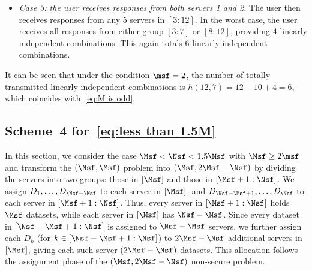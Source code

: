 \documentclass[conference,letterpaper]{IEEEtran}
\begin{document}
\begin{example}
\begin{itemize}
\item {\it Case 3: the user receives responses from both servers 1 and 2.} The user then receives responses from any 5 servers in $[3:12]$. In the worst case, the user receives all responses from either group $[3:7]$ or $[8:12]$, providing 4 linearly independent combinations. This again totals 6 linearly independent combinations.
\end{itemize}
It can be seen that under the condition $\msf = 2$, the number of totally transmitted linearly independent combinations is $h(12,7) = 12 - 10 + 4 = 6$, which coincides with~\eqref{eq:M is odd}.


\fi

\end{example}

\subsection{\texorpdfstring{Scheme~4 for~\eqref{eq:less than 1.5M}}{Scheme 4 for Eq. (Z)}}
\label{sub:less than 1.5M}
In this section, we consider the case \( \Msf < \Nsf < 1.5 \Msf \) with \( \Msf \ge 2 \msf \) and transform the \((\Nsf,\Msf)\) problem into \((\Msf, 2\Msf - \Nsf)\) by dividing the servers into two groups: those in \([\Msf]\) and those in \([\Msf+1 : \Nsf]\).
We assign \(D_1, \ldots, D_{\Nsf - \Msf}\) to each server in \([\Msf]\), and \(D_{\Nsf - \Msf + 1}, \ldots, D_{\Nsf}\) to each server in \([\Msf+1 : \Nsf]\). Thus, every server in \([\Msf+1 : \Nsf]\) holds \(\Msf\) datasets, while each server in \([\Msf]\) has \(\Nsf - \Msf\). Since every dataset in \([\Nsf - \Msf + 1 : \Nsf]\) is assigned to \(\Nsf - \Msf\) servers, we further assign each \(D_k\) (for \(k \in [\Nsf - \Msf + 1 : \Nsf]\)) to \(2\Msf - \Nsf\) additional servers in \([\Msf]\), giving each such server \((2\Msf - \Nsf)\) datasets. This allocation follows the assignment phase of the \((\Msf, 2\Msf - \Nsf)\) non-secure problem.


\iffalse
\section{Conclusion}
We focus on the secure distributed linearly separable computation problem, which prevents the user from accessing any information about the dataset besides the task function. We first research the minimum source key size under general computation cost while achieving optimal communication cost. For this purpose, we propose a new computing scheme with a novel assignment strategy. The computing scheme can cover the optimality results of the computing scheme with fractional repetition assignment. The new computing scheme is also applicable to the case of minimal computation cost in \cite{wan2022secure}.
\fi
\end{document}
